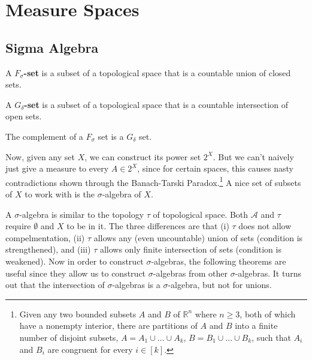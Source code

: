 \section{Measure Spaces}

\subsection{Sigma Algebra}

  \begin{definition}
    A \textbf{$F_\sigma$-set} is a subset of a topological space that is a countable union of closed sets. 
  \end{definition}

  \begin{definition}
    A \textbf{$G_\delta$-set} is a subset of a topological space  that is a countable intersection of open sets. 
  \end{definition}

  \begin{lemma}
    The complement of a $F_\sigma$ set is a $G_\delta$ set. 
  \end{lemma} 
  
  Now, given any set $X$, we can construct its power set $2^X$. But we can't naively just give a measure to every $A \in 2^X$, since for certain spaces, this causes nasty contradictions shown through the Banach-Tarski Paradox.\footnote{Given any two bounded subsets $A$ and $B$ of $\mathbb{R}^n$ where $n \geq 3$, both of which have a nonempty interior, there are partitions of $A$ and $B$ into a finite number of disjoint subsets, $A = A_1 \cup \ldots \cup A_k$, $B = B_1 \cup \ldots \cup B_k$, such that $A_i$ and $B_i$ are congruent for every $i \in [k]$.} A nice set of subsets of $X$ to work with is the $\sigma$-algebra of $X$. 

  A $\sigma$-algebra is similar to the topology $\tau$ of topological space. Both $\mathcal{A}$ and $\tau$ require $\emptyset$ and $X$ to be in it. The three differences are that (i) $\tau$ does not allow compelmentation, (ii) $\tau$ allows any (even uncountable) union of sets (condition is strengthened), and (iii) $\tau$ allows only finite intersection of sets (condition is weakened). Now in order to construct $\sigma$-algebras, the following theorems are useful since they allow us to construct $\sigma$-algebras from other $\sigma$-algebras. It turns out that the intersection of $\sigma$-algebras is a $\sigma$-algebra, but not for unions. 

